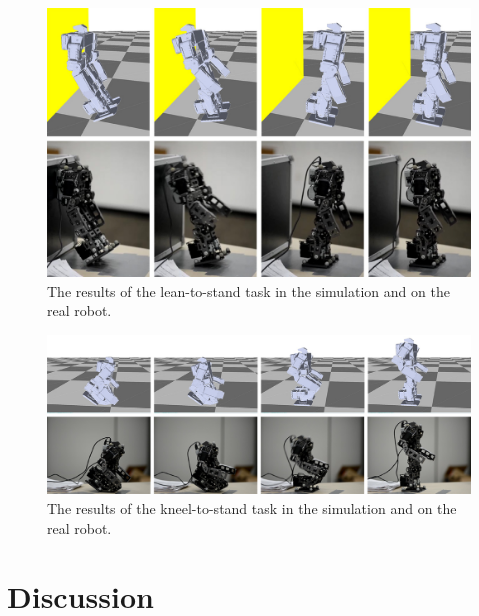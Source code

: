 \begin{figure}[!t]
  \centering
  \includegraphics[width=\textwidth]{figures/lean2Stand}
  \caption{The results of the lean-to-stand task in the simulation and on the real robot.}
  \label{fig:lean2Stand}
\end{figure}

\begin{figure}[!t]
  \centering
  \includegraphics[width=\textwidth]{figures/kneel2Stand}
  \caption{The results of the kneel-to-stand task in the simulation and on the real robot.}
  \label{fig:kneel2Stand}
\end{figure}

\section{Discussion}
